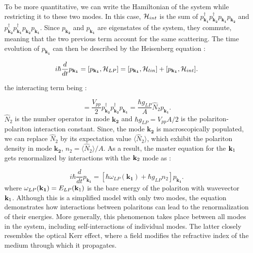 To be more quantitative, we can write the Hamiltonian of the system while restricting it to these two modes. In this case, $\mathcal{H}_{int}$ is the sum of $p^\dagger_\mathbf{k_1}p^\dagger_\mathbf{k_2}p_\mathbf{k_1}p_\mathbf{k_2}$ and $p^\dagger_\mathbf{k_2}p^\dagger_\mathbf{k_1}p_\mathbf{k_2}p_\mathbf{k_1}$. Since $p_\mathbf{k_2}$ and $p_\mathbf{k_1}$ are eigenstates of the system, they commute, meaning that the two previous term account for the same scattering.
The time evolution of $p_{\mathbf{k_1}}$ can then be described by the Heisenberg equation : 

\begin{equation}
    i\hbar \dfrac{d}{dt}p_\mathbf{k_1} = [p_\mathbf{k_1}, \mathcal{H}_{LP}] = [p_\mathbf{k_1},\mathcal{H}_{lin}] + [p_\mathbf{k_1},\mathcal{H}_{int}].
\end{equation}

the interacting term being :

\begin{equation}
    [p_\mathbf{k_1},\Ham_{int}]=\dfrac{V_{pp}}{2}p^\dagger_\mathbf{k_2}p^\dagger_\mathbf{k_2}p_\mathbf{k_1}= \dfrac{\hbar g_{LP}}{A}\hat{N}_{2}p_\mathbf{k_1}.
\end{equation}
$\hat{N}_{2}$ is the number operator in mode $\mathbf{k_2}$ and $\hbar g_{LP} = V_{pp}A/2$  is the polariton-polariton interaction constant. Since, the mode 
$\mathbf{k_2}$ is macroscopically populated, we can replace $\hat{N}_{2}$ by its expectation value $\langle \hat{N}_{2} \rangle$, which exhibit the polariton density in mode $\mathbf{k_2}$, $n_{2}=\langle \hat{N}_{2} \rangle/A$.
As a result, the master equation for the $\mathbf{k}_1$ gets renormalized by interactions with the $\mathbf{k}_2$ mode as :

\begin{equation}
    i\hbar \dfrac{d}{dt}p_\mathbf{k_1} = \left[\hbar\omega_{LP}(\mathbf{k_1}) + \hbar g_{LP}n_{2}\right]p_\mathbf{k_1}.
    \label{eq:renormalized_energy}
\end{equation}
where $\omega_{LP}(\mathbf{k_1})=E_{LP}(\mathbf{k}_1)$ is the bare energy of the polariton with wavevector $\mathbf{k}_1$. Although this is a simplified model with only two modes, the equation demonstrates how interactions between polaritons can lead to the renormalization of their energies. More generally, this phenomenon takes place between all modes in the system, including self-interactions of individual modes.
 The latter closely resembles the optical Kerr effect, where a field modifies the refractive index of the medium through which it propagates.

